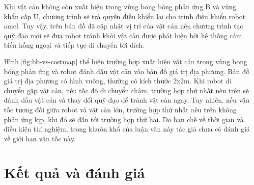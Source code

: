 Khi vật cản không còn xuất hiện trong vùng bong bóng phản ứng B và vùng khẩn cấp U, chương trình sẽ trả quyền điều khiển lại cho trình điều khiển robot amcl. Tuy vậy, trên bản đồ đã cập nhật vị trí của vật cản nên chương trình tạo quỹ đạo mới sẽ đưa robot tránh khỏi vật cản được phát hiện bởi hệ thống cảm biến hồng ngoại và tiếp tục di chuyển tới đích.

Hình \ref{fig:bb-vs-costmap} thể hiện trường hợp xuất hiện vật cản trong vùng bong bóng phản ứng và robot đánh dấu vật cản vào bản đồ giá trị địa phương. Bản đồ giá trị địa phương có hình vuông, thường có kích thước 2x2m. Khi robot di chuyển gặp vật cản, nếu tốc độ di chuyển chậm, trường hợp thứ nhất nêu trên sẽ đánh dấu vật cản và thay đổi quỹ đạo để tránh vật cản ngay. Tuy nhiên, nếu vận tốc tương đối giữa robot và vật cản lớn, trường hợp thứ nhất nêu trên không phản ứng kịp, khi đó sẽ dẫn tới trường hợp thứ hai. Do hạn chế về thời gian và điều kiện thí nghiệm, trong khuôn khổ của luận văn này tác giả chưa có đánh giá về giới hạn vận tốc này.

\section{Kết quả và đánh giá}
\label{sec:testbed}




